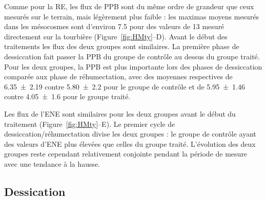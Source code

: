 Comme pour la RE, les flux de PPB sont du même ordre de grandeur que ceux mesurés sur le terrain, mais légèrement plus faible : les maximas moyens mesurés dans les mésocosmes sont d'environ \num{7.5} pour des valeurs de \SI{13}{\uml} mesuré directement sur la tourbière (Figure~\ref{fig:HMty}--D).
Avant le début des traitements les flux des deux groupes sont similaires.
La première phase de dessiccation fait passer la PPB du groupe de contrôle au dessus du groupe traité.
Pour les deux groupes, la PPB est plus importante lors des phases de dessiccation comparée aux phase de réhumectation, avec des moyennes respectives de \num{6.35(219)} contre \num{5.80(220)} pour le groupe de contrôle et de \num{5.95(146)} contre \SI{4.05(160)}{\uml} pour le groupe traité.

Les flux de l'ENE sont similaires pour les deux groupes avant le début du traitement (Figure~\ref{fig:HMty}--E).
Le premier cycle de dessiccation/réhumectation divise les deux groupes : le groupe de contrôle ayant des valeurs d'ENE plus élevées que celles du groupe traité.
L'évolution des deux groupes reste cependant relativement conjointe pendant la période de mesure avec une tendance à la hausse.

%
%
%

\subsection{Dessication}

